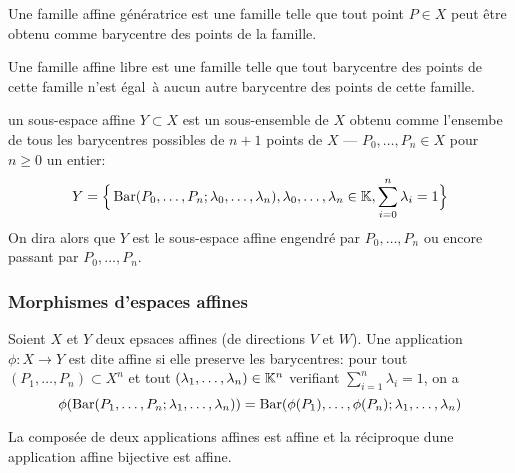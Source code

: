 \begin{definition}
	Une famille affine génératrice est une famille telle que tout point $P \in X$
	peut être obtenu comme barycentre des points de la famille.
\end{definition}

\begin{definition}
	Une famille affine libre est une famille telle que tout barycentre des points
	de cette famille n'est égal à aucun autre barycentre des points de cette
	famille.
\end{definition}

\begin{definition}
	un sous-espace affine $Y \subset X$ est un sous-ensemble de $X$ obtenu comme
	l'ensembe de tous les barycentres possibles de $n+1$ points de $X$ --- 
	$P_0, \dots, P_n \in X$ pour $n \geq 0$ un entier:
	\begin{equation*}
		Y = \Big\{\operatorname{Bar}(P_0, \dots, P_n; \lambda_0, \dots, \lambda_n), 
		\lambda_0, \dots, \lambda_n \in \mathbb{K}, \sum_{i=0}^n \lambda_i = 1\Big\}
	\end{equation*}
	On dira alors que $Y$ est le sous-espace affine engendré par $P_0, \dots, P_n$
	ou encore passant par $P_0, \dots, P_n$.
\end{definition}

\subsubsection{Morphismes d'espaces affines}

\begin{definition}
	Soient $X$ et $Y$ deux epsaces affines (de directions $V$ et $W$). Une
	application $\phi: X \to Y$ est dite affine si elle preserve les barycentres:
	pour tout $(P_1, \dots, P_n) \subset X^n$ et tout
	$(\lambda_1, \dots, \lambda_n) \in \mathbb{K}^n$ verifiant
	$\sum_{i=1}^n \lambda_i = 1$, on a
	\begin{equation*}
		\phi(\operatorname{Bar}(P_1, \dots, P_n; \lambda_1, \dots, \lambda_n)) = 
		\operatorname{Bar}(\phi(P_1), \dots, \phi(P_n); \lambda_1, \dots, \lambda_n)
	\end{equation*}
\end{definition}

\begin{proposition}
	La composée de deux applications affines est affine et la réciproque dune
	application affine bijective est affine.
\end{proposition}

